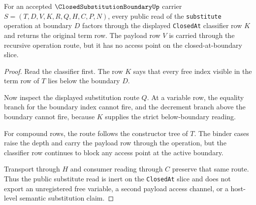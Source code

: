 \begin{theorem}
\label{thm:closed-substitution-boundary-substitute-inertness-route}
For an accepted $\ClosedSubstitutionBoundaryUp$ carrier $S=(T,D,V,K,R,Q,H,C,P,N)$, every public read of the \texttt{substitute} operation at boundary $D$ factors through the displayed \texttt{ClosedAt} classifier row $K$ and returns the original term row. The payload row $V$ is carried through the recursive operation route, but it has no access point on the closed-at-boundary slice.
\end{theorem}
\begin{proof}
Read the classifier first. The row $K$ says that every free index visible in the term row of $T$ lies below the boundary $D$.

Now inspect the displayed substitution route $Q$. At a variable row, the equality branch for the boundary index cannot fire, and the decrement branch above the boundary cannot fire, because $K$ supplies the strict below-boundary reading.

For compound rows, the route follows the constructor tree of $T$. The binder cases raise the depth and carry the payload row through the operation, but the classifier row continues to block any access point at the active boundary.

Transport through $H$ and consumer reading through $C$ preserve that same route. Thus the public substitute read is inert on the \texttt{ClosedAt} slice and does not export an unregistered free variable, a second payload access channel, or a host-level semantic substitution claim.
\end{proof}

